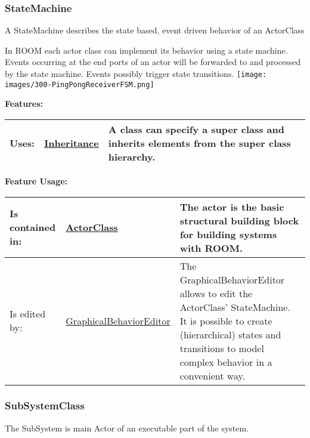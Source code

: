 \subsubsection{StateMachine}
	\hypertarget{ref:StateMachine}{}
	A StateMachine describes the state based, event driven behavior of an ActorClass
		
	In ROOM each actor class can implement its behavior using a state machine. Events occurring at the end ports of an actor will be forwarded to and processed by the state machine. Events possibly trigger state transitions.
	\texttt{[image: images/300-PingPongReceiverFSM.png]}
		
		
	\begingroup
	\textbf{Features:}
	\renewcommand{\arraystretch}{1.8} %
	\begin{longtable}{l|l p{}}
		\hline
	Uses: & \tabitem \hyperlink{ref:Inheritance}{Inheritance}  & A class can specify a super class and inherits elements from the super class hierarchy.\\
	\hline
	\end{longtable}
	\endgroup
		
	\begingroup
	\textbf{Feature Usage:}
	\renewcommand{\arraystretch}{1.8} %
	\begin{longtable}{l|l p{}}
		\hline
	Is contained in: & \tabitem \hyperlink{ref:ActorClass}{ActorClass}  & The actor is the basic structural building block for building systems with ROOM.\\
	\hline
	Is edited by: & \tabitem \hyperlink{ref:GraphicalBehaviorEditor}{GraphicalBehaviorEditor}  & The GraphicalBehaviorEditor allows to edit the ActorClass' StateMachine. It is possible to create (hierarchical) states and transitions to model complex behavior in a convenient way.\\
	\hline
	\end{longtable}
	\endgroup
		
	
	\vspace{\baselineskip}
	\vspace{\baselineskip}
	\vspace{\baselineskip}
	
\subsubsection{SubSystemClass}
	\hypertarget{ref:SubSystemClass}{}
	The SubSystem is main Actor of an executable part of the system. 
		
